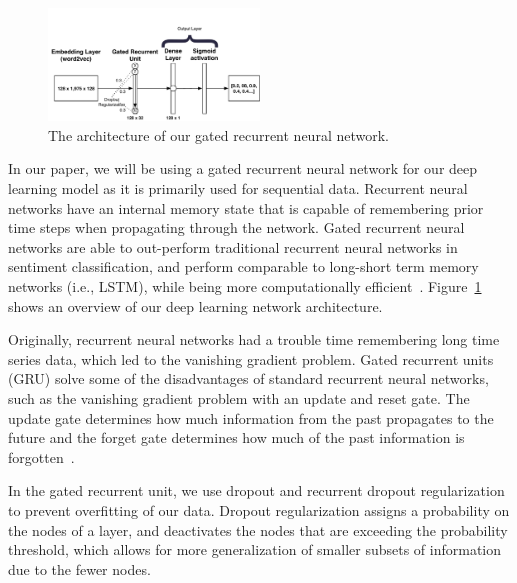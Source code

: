 \documentclass[conference]{IEEEtran}
\begin{document}
\begin{figure}[!t]
\center
    \includegraphics[width=0.5\textwidth]{img/methodology/network_architecture.pdf}
  \caption{The architecture of our gated recurrent neural network.}
  \label{fig:model_architecture}
\end{figure}


In our paper, we will be using a gated recurrent neural network for our deep learning model as it is primarily used for sequential data. Recurrent neural networks have an internal memory state that is capable of remembering prior time steps when propagating through the network. Gated recurrent neural networks are able to out-perform traditional recurrent neural networks in sentiment classification, and perform comparable to long-short term memory networks (i.e., LSTM), while being more computationally efficient~\cite{chung2014empirical, tang2015document}. Figure~\ref{fig:model_architecture} shows an overview of our deep learning network architecture.


Originally, recurrent neural networks had a trouble time remembering long time series data, which led to the vanishing gradient problem. Gated recurrent units (GRU) solve some of the disadvantages of standard recurrent neural networks, such as the vanishing gradient problem with an update and reset gate. The update gate determines how much information from the past propagates to the future and the forget gate determines how much of the past information is forgotten~\cite{updateresetgate, chung2015gated}. 


In the gated recurrent unit, we use dropout and recurrent dropout regularization to prevent overfitting of our data. Dropout regularization assigns a probability on the nodes of a layer, and deactivates the nodes that are exceeding the probability threshold, which allows for more generalization of smaller subsets of information due to the fewer nodes.
\end{document}
